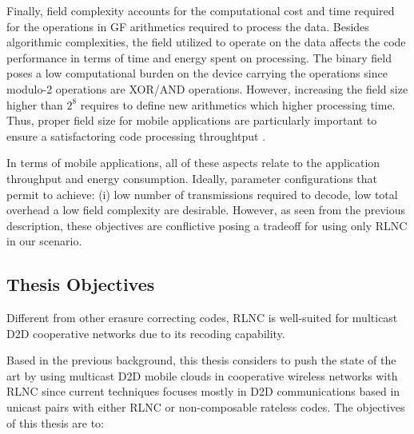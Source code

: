 Finally, field complexity accounts for the computational cost and time required for the operations in \ac{GF} arithmetics required to process the data. Besides algorithmic complexities, the field utilized to operate on the data affects the code performance in terms of time and energy spent on processing. The binary field poses a low computational burden on the device carrying the operations since modulo-2 operations are XOR/AND operations. However, increasing the field size higher than $2^8$ requires to define new arithmetics which higher processing time. Thus, proper field size for mobile applications are particularly important to ensure a satisfactoring code processing throughtput \cite{heide2009network,paramanathan2013lean}.

In terms of mobile applications, all of these aspects relate to the application throughput and energy consumption. Ideally, parameter configurations that permit to achieve: (i) low number of transmissions required to decode, low total overhead a low field complexity are desirable. However, as seen from the previous description, these objectives are conflictive posing a tradeoff for using only \ac{RLNC} in our scenario.

\subsection{Thesis Objectives}
Different from other erasure correcting codes, \ac{RLNC} is well-suited for multicast \ac{D2D} cooperative networks due to its recoding capability.



Based in the previous background, this thesis considers to push the state of the art by using multicast \ac{D2D} mobile clouds in cooperative wireless networks with \ac{RLNC} since current techniques focuses mostly in \ac{D2D} communications based in unicast pairs with either \ac{RLNC} or non-composable rateless codes. The objectives of this thesis are to:

